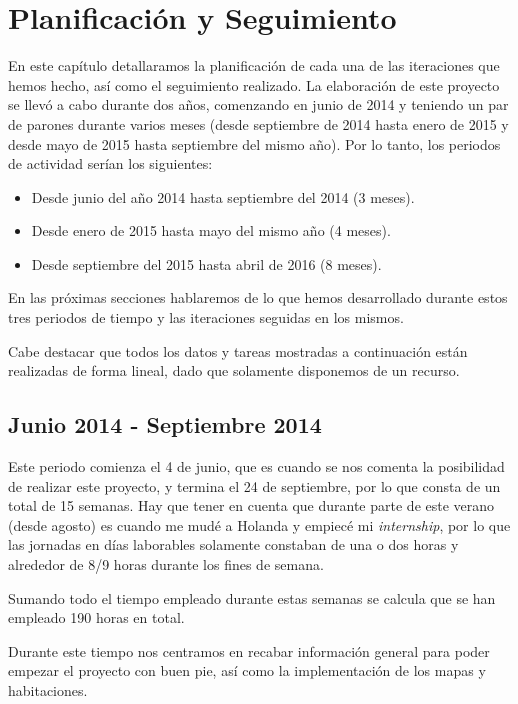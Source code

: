 \chapter{Planificación y Seguimiento}

En este capítulo detallaramos la planificación de cada una de las iteraciones que hemos hecho, así como el seguimiento realizado. La elaboración de este proyecto se llevó a cabo durante dos años, comenzando en junio de 2014 y teniendo un par de parones durante varios meses (desde septiembre de 2014 hasta enero de 2015 y desde mayo de 2015 hasta septiembre del mismo año). 
Por lo tanto, los periodos de actividad serían los siguientes:

\begin{itemize}
  \item Desde junio del año 2014 hasta septiembre del 2014 (3 meses).
  \item Desde enero de 2015 hasta mayo del mismo año (4 meses).
  \item Desde septiembre del 2015 hasta abril de 2016 (8 meses).
\end{itemize}

En las próximas secciones hablaremos de lo que hemos desarrollado durante estos tres periodos de tiempo y las iteraciones seguidas en los mismos.

Cabe destacar que todos los datos y tareas mostradas a continuación están realizadas de forma lineal, dado que solamente disponemos de un recurso.

\section{Junio 2014 - Septiembre 2014}

Este periodo comienza el 4 de junio, que es cuando se nos comenta la posibilidad de realizar este proyecto, y termina el 24 de septiembre, por lo que consta de un total de 15 semanas. Hay que tener en cuenta que durante parte de este verano (desde agosto) es cuando me mudé a Holanda y empiecé mi \textit{internship}, por lo que las jornadas en días laborables solamente constaban de una o dos horas y alrededor de 8/9 horas durante los fines de semana.

Sumando todo el tiempo empleado durante estas semanas se calcula que se han empleado 190 horas en total.

Durante este tiempo nos centramos en recabar información general para poder empezar el proyecto con buen pie, así como la implementación de los mapas y habitaciones.

